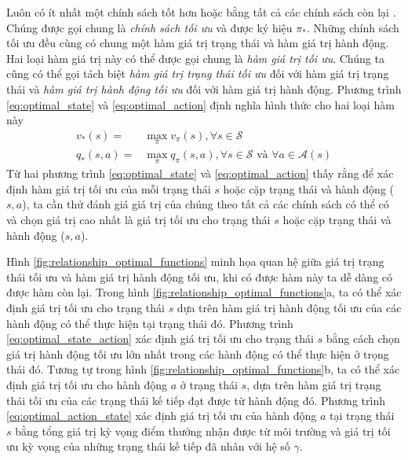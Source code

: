 	Luôn có ít nhất một chính sách tốt hơn hoặc bằng tất cả các chính sách còn lại \cite{sutton1998introduction}. Chúng được gọi chung là \textit{chính sách tối ưu} và được ký hiệu $\pi_{*}$. Những chính sách tối ưu đều cùng có chung một hàm giá trị trạng thái và hàm giá trị hành động. Hai loại hàm giá trị này có thể được gọi chung là \textit{hàm giá trị tối ưu}. Chúng ta cũng có thể gọi tách biệt \textit{hàm giá trị trạng thái tối ưu} đối với hàm giá trị trạng thái và \textit{hàm giá trị hành động tối ưu} đối với hàm giá trị hành động. Phương trình \ref{eq:optimal_state} và \ref{eq:optimal_action} định nghĩa hình thức cho hai loại hàm này
	\begin{align}
		v_{*}(s) = {} & \max_{\pi}v_{\pi}(s), \forall s \in \mathcal{S} \label{eq:optimal_state} \\
		q_{*}(s,a) = {} & \max_{\pi}q_{\pi}(s,a), \forall s \in \mathcal{S} \text{ và } \forall a \in \mathcal{A}(s) \label{eq:optimal_action}
	\end{align}
	Từ hai phương trình \ref{eq:optimal_state} và \ref{eq:optimal_action} thấy rằng để xác định hàm giá trị tối ưu của mỗi trạng thái $s$ hoặc cặp trạng thái và hành động ($s,a$), ta cần thử đánh giá giá trị của chúng theo tất cả các chính sách có thể có và chọn giá trị cao nhất là giá trị tối ưu cho trạng thái $s$ hoặc cặp trạng thái và hành động ($s,a$).
	
	Hình \ref{fig:relationship_optimal_functions} minh họa quan hệ giữa giá trị trạng thái tối ưu và hàm giá trị hành động tối ưu, khi có được hàm này ta dễ dàng có được hàm còn lại. Trong hình \ref{fig:relationship_optimal_functions}a, ta có thể xác định giá trị tối ưu cho trạng thái $s$ dựa trên hàm giá trị hành động tối ưu của các hành động có thể thực hiện tại trạng thái đó. Phương trình \ref{eq:optimal_state_action} xác định giá trị tối ưu cho trạng thái $s$ bằng cách chọn giá trị hành động tối ưu lớn nhất trong các hành động có thể thực hiện ở trọng thái đó. Tương tự trong hình \ref{fig:relationship_optimal_functions}b, ta có thể xác định giá trị tối ưu cho hành động $a$ ở trạng thái $s$, dựa trên hàm giá trị trạng thái tối ưu của các trạng thái kế tiếp đạt được từ hành động đó. Phương trình \ref{eq:optimal_action_state} xác định giá trị tối ưu của hành động $a$ tại trạng thái $s$ bằng tổng giá trị kỳ vọng điểm thưởng nhận được từ môi trường và giá trị tối ưu kỳ vọng của những trạng thái kế tiếp đã nhân với hệ số $\gamma$.
	
